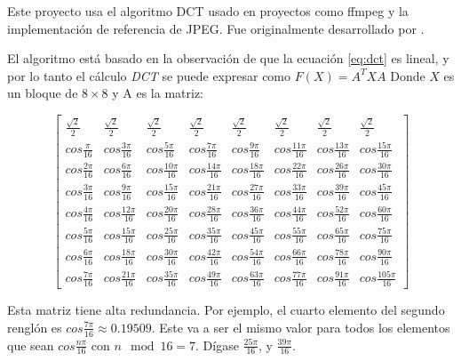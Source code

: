 {Este proyecto usa el algoritmo \gls{DCT} usado en proyectos como ffmpeg y la
implementación de referencia de JPEG. Fue originalmente desarrollado por
\cite{ahmed_dct}.

El algoritmo está basado en la observación de que la ecuación \ref{eq:dct} es
lineal, y por lo tanto el cálculo \emph{DCT} se puede expresar como $F(X) =
A^{T}XA$ Donde $X$ es un bloque de $8\times8$ y A es la matriz:

\begin{equation}
    \label{eq:dct-matrix}
    \begin{bmatrix}
        \frac{\sqrt{2}}{2} & \frac{\sqrt{2}}{2} & \frac{\sqrt{2}}{2} & \frac{\sqrt{2}}{2} & \frac{\sqrt{2}}{2} & \frac{\sqrt{2}}{2} & \frac{\sqrt{2}}{2} & \frac{\sqrt{2}}{2} \\
        cos\frac{\pi}{16} & cos\frac{3\pi}{16}& cos\frac{5\pi}{16}& cos\frac{7\pi}{16}& cos\frac{9\pi}{16}& cos\frac{11\pi}{16}& cos\frac{13\pi}{16}& cos\frac{15\pi}{16} \\
        cos\frac{2\pi}{16} & cos\frac{6\pi}{16}& cos\frac{10\pi}{16}& cos\frac{14\pi}{16}& cos\frac{18\pi}{16}& cos\frac{22\pi}{16}& cos\frac{26\pi}{16}& cos\frac{30\pi}{16} \\
        cos\frac{3\pi}{16} & cos\frac{9\pi}{16}& cos\frac{15\pi}{16}& cos\frac{21\pi}{16}& cos\frac{27\pi}{16}& cos\frac{33\pi}{16}& cos\frac{39\pi}{16}& cos\frac{45\pi}{16} \\
        cos\frac{4\pi}{16} & cos\frac{12\pi}{16}& cos\frac{20\pi}{16}& cos\frac{28\pi}{16}& cos\frac{36\pi}{16}& cos\frac{44\pi}{16}& cos\frac{52\pi}{16}& cos\frac{60\pi}{16} \\
        cos\frac{5\pi}{16} & cos\frac{15\pi}{16}& cos\frac{25\pi}{16}& cos\frac{35\pi}{16}& cos\frac{45\pi}{16}& cos\frac{55\pi}{16}& cos\frac{65\pi}{16}& cos\frac{75\pi}{16} \\
        cos\frac{6\pi}{16} & cos\frac{18\pi}{16}& cos\frac{30\pi}{16}& cos\frac{42\pi}{16}& cos\frac{54\pi}{16}& cos\frac{66\pi}{16}& cos\frac{78\pi}{16}& cos\frac{90\pi}{16} \\
        cos\frac{7\pi}{16} & cos\frac{21\pi}{16}& cos\frac{35\pi}{16}& cos\frac{49\pi}{16}& cos\frac{63\pi}{16}& cos\frac{77\pi}{16}& cos\frac{91\pi}{16}& cos\frac{105\pi}{16}
    \end{bmatrix}
\end{equation}

Esta matriz tiene alta redundancia. Por ejemplo, el cuarto elemento del segundo renglón es $cos\frac{7\pi}{16} \approx 0.19509$. Este va a ser el mismo valor para todos los elementos que sean $cos\frac{n\pi}{16}$ con $n \mod 16 = 7$. Dígase $\frac{25\pi}{16}$, y $\frac{39\pi}{16}$.

}
